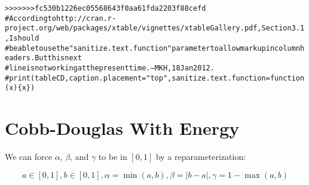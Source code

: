 \documentclass[preprint,authoryear,12pt]{elsarticle}\usepackage{graphicx, color}
\makeatletter
\newcommand{\hlcomment}[1]{\textcolor[rgb]{0.180392156862745,0.6,0.341176470588235}{#1}}%
\newenvironment{kframe}{%
 \def\at@end@of@kframe{}%
 \ifinner\ifhmode%
  \def\at@end@of@kframe{\end{minipage}}%
  \begin{minipage}{\columnwidth}%
 \fi\fi%
 \def\FrameCommand##1{\hskip\@totalleftmargin \hskip-\fboxsep
 \colorbox{shadecolor}{##1}\hskip-\fboxsep
     \hskip-\linewidth \hskip-\@totalleftmargin \hskip\columnwidth}%
 \MakeFramed {\advance\hsize-\width
   \@totalleftmargin\z@ \linewidth\hsize
   \@setminipage}}%
 {\par\unskip\endMakeFramed%
 \at@end@of@kframe}
\makeatother
\begin{document}
\begin{kframe}\begin{alltt}
>>>>>>> fc530b1226ec05568643f0aa61fda2203f88cefd
\hlcomment{# According to http://cran.r-project.org/web/packages/xtable/vignettes/xtableGallery.pdf, Section 3.1, I should }
\hlcomment{# be able to use the "sanitize.text.function" parameter to allow markup in column headers. But this next}
\hlcomment{# line is not working at the present time. --MKH, 18 Jan 2012.}
\hlcomment{# print(tableCD, caption.placement="top", sanitize.text.function = function(x)\{x\})}
\end{alltt}
\end{kframe}


\section{Cobb-Douglas With Energy}

We can force $\alpha$, $\beta$, and $\gamma$ to be in $[0,1]$ by a reparameterization:

\[ a \in[0,1], b \in [0,1], \alpha=\min(a,b), \beta=|b-a|, \gamma = 1-\max(a,b) \]
\end{document}
